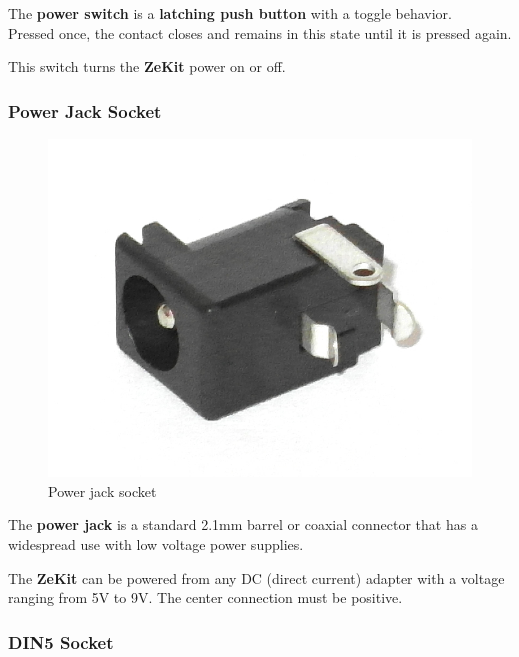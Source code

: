 \documentclass{scrartcl}
\begin{document}
The \textbf{power switch} is a \textbf{latching push button} with a toggle behavior. \\
Pressed once, the contact closes and remains in this state until it is pressed again.

This switch turns the \textbf{ZeKit} power on or off.

\subsubsection{Power Jack Socket}

\begin{figure}[!ht]
    \begin{center}
        \includegraphics[scale=0.15]{assets/zekit-dcjack.jpg}
        \caption{Power jack socket}
    \end{center}
\end{figure}

The \textbf{power jack} is a standard 2.1mm barrel or coaxial connector that has a widespread use with low voltage power supplies.

The \textbf{ZeKit} can be powered from any DC (direct current) adapter with a voltage ranging from 5V to 9V. The center connection must be positive.

\subsubsection{DIN5 Socket}
\end{document}

